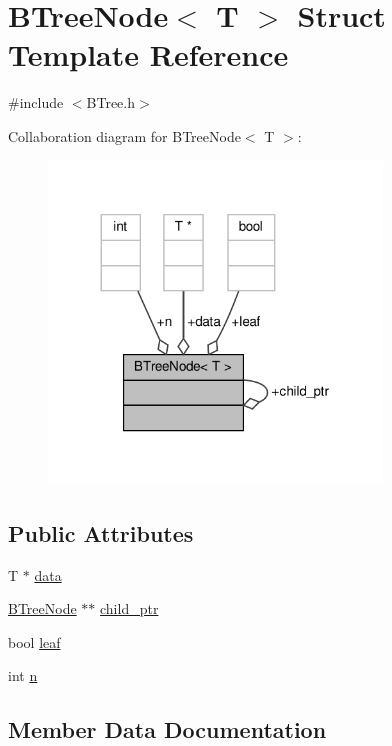 \hypertarget{structBTreeNode}{}\section{B\+Tree\+Node$<$ T $>$ Struct Template Reference}
\label{structBTreeNode}


{\ttfamily \#include $<$B\+Tree.\+h$>$}



Collaboration diagram for B\+Tree\+Node$<$ T $>$\+:\nopagebreak
\begin{figure}[H]
\begin{center}
\leavevmode
\includegraphics[width=251pt]{structBTreeNode__coll__graph}
\end{center}
\end{figure}
\subsection*{Public Attributes}
\begin{DoxyCompactItemize}
\item 
T $\ast$ \hyperlink{structBTreeNode_af877c66e47b110ed0f05e95351003531}{data}
\item 
\hyperlink{structBTreeNode}{B\+Tree\+Node} $\ast$$\ast$ \hyperlink{structBTreeNode_a723857b74be44c1921f17e177432a844}{child\+\_\+ptr}
\item 
bool \hyperlink{structBTreeNode_a8350f9ddcf6e2323413d9d061c382ea6}{leaf}
\item 
int \hyperlink{structBTreeNode_ac6993709a99bec1116e1c6dccc3c0f8a}{n}
\end{DoxyCompactItemize}


\subsection{Member Data Documentation}
\mbox{\label{structBTreeNode_a723857b74be44c1921f17e177432a844}} 
